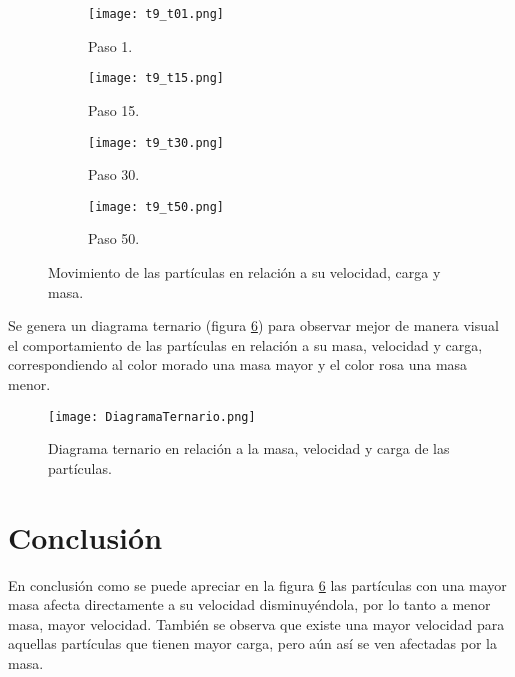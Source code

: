 \documentclass[12pt]{amsart}
\begin{document}
\begin{figure}[h!]
\centering
\begin{subfigure}[b]{0.3\linewidth}
\texttt{[image: t9\_t01.png]}
\caption{Paso 1.}
\label{a}
\end{subfigure}
\begin{subfigure}[b]{0.3\linewidth}
\texttt{[image: t9\_t15.png]}
\caption{Paso 15.}
\label{b}
\end{subfigure}
\begin{subfigure}[b]{0.3\linewidth}
\texttt{[image: t9\_t30.png]}
\caption{Paso 30.}
\label{c}
\end{subfigure}
\begin{subfigure}[b]{0.3\linewidth}
\texttt{[image: t9\_t50.png]}
\caption{Paso 50.}
\label{d}
\end{subfigure}
\caption{Movimiento de las partículas en relación a su velocidad, carga y masa.}
\label{fig1}
\end{figure}

\clearpage

Se genera un diagrama ternario (figura \ref{fig2}) para observar mejor de manera visual el comportamiento de las partículas en relación a su masa, velocidad y carga, correspondiendo al color morado una masa mayor y el color rosa una masa menor.
\begin{figure} [h!]
    \centering
    \texttt{[image: DiagramaTernario.png]}
    \caption{Diagrama ternario en relación a la masa, velocidad y carga de las partículas.}
    \label{fig2}
\end{figure}


\section{Conclusión}
En conclusión como se puede apreciar en la figura \ref{fig2} las partículas con una mayor masa afecta directamente a su velocidad disminuyéndola, por lo tanto a menor masa, mayor velocidad. También se observa que existe una mayor velocidad para aquellas partículas que tienen mayor carga, pero aún así se ven afectadas por la masa.

\clearpage


\end{document}
